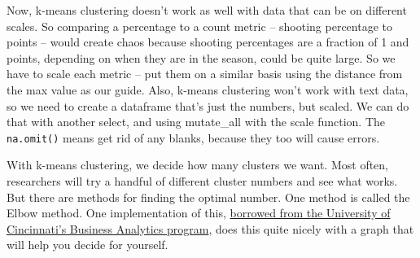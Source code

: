 \documentclass[
]{book}
\newenvironment{Shaded}{\begin{snugshade}}{\end{snugshade}}
\newcommand{\DataTypeTok}[1]{\textcolor[rgb]{0.13,0.29,0.53}{#1}}
\newcommand{\DecValTok}[1]{\textcolor[rgb]{0.00,0.00,0.81}{#1}}
\newcommand{\KeywordTok}[1]{\textcolor[rgb]{0.13,0.29,0.53}{\textbf{#1}}}
\newcommand{\NormalTok}[1]{#1}
\newcommand{\OperatorTok}[1]{\textcolor[rgb]{0.81,0.36,0.00}{\textbf{#1}}}
\newcommand{\StringTok}[1]{\textcolor[rgb]{0.31,0.60,0.02}{#1}}
\begin{document}
\begin{Shaded}
\end{Shaded}

Now, k-means clustering doesn't work as well with data that can be on different scales. So comparing a percentage to a count metric -- shooting percentage to points -- would create chaos because shooting percentages are a fraction of 1 and points, depending on when they are in the season, could be quite large. So we have to scale each metric -- put them on a similar basis using the distance from the max value as our guide. Also, k-means clustering won't work with text data, so we need to create a dataframe that's just the numbers, but scaled. We can do that with another select, and using mutate\_all with the scale function. The \texttt{na.omit()} means get rid of any blanks, because they too will cause errors.

\begin{Shaded}
\end{Shaded}

With k-means clustering, we decide how many clusters we want. Most often, researchers will try a handful of different cluster numbers and see what works. But there are methods for finding the optimal number. One method is called the Elbow method. One implementation of this, \href{https://uc-r.github.io/kmeans_clustering}{borrowed from the University of Cincinnati's Business Analytics program}, does this quite nicely with a graph that will help you decide for yourself.
\end{document}
